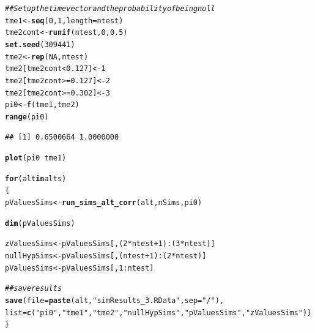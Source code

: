 \documentclass{article}\usepackage[]{graphicx}\usepackage[]{color}
\makeatletter
\newcommand{\hlnum}[1]{\textcolor[rgb]{0.686,0.059,0.569}{#1}}%
\newcommand{\hlstr}[1]{\textcolor[rgb]{0.192,0.494,0.8}{#1}}%
\newcommand{\hlcom}[1]{\textcolor[rgb]{0.678,0.584,0.686}{\textit{#1}}}%
\newcommand{\hlopt}[1]{\textcolor[rgb]{0,0,0}{#1}}%
\newcommand{\hlstd}[1]{\textcolor[rgb]{0.345,0.345,0.345}{#1}}%
\newcommand{\hlkwa}[1]{\textcolor[rgb]{0.161,0.373,0.58}{\textbf{#1}}}%
\newcommand{\hlkwb}[1]{\textcolor[rgb]{0.69,0.353,0.396}{#1}}%
\newcommand{\hlkwc}[1]{\textcolor[rgb]{0.333,0.667,0.333}{#1}}%
\newcommand{\hlkwd}[1]{\textcolor[rgb]{0.737,0.353,0.396}{\textbf{#1}}}%
\newenvironment{kframe}{%
 \def\at@end@of@kframe{}%
 \ifinner\ifhmode%
  \def\at@end@of@kframe{\end{minipage}}%
  \begin{minipage}{\columnwidth}%
 \fi\fi%
 \def\FrameCommand##1{\hskip\@totalleftmargin \hskip-\fboxsep
 \colorbox{shadecolor}{##1}\hskip-\fboxsep
     \hskip-\linewidth \hskip-\@totalleftmargin \hskip\columnwidth}%
 \MakeFramed {\advance\hsize-\width
   \@totalleftmargin\z@ \linewidth\hsize
   \@setminipage}}%
 {\par\unskip\endMakeFramed%
 \at@end@of@kframe}
\newenvironment{knitrout}{}{} %
\makeatother
\begin{document}
\begin{knitrout}
\color{fgcolor}\begin{kframe}
\begin{alltt}
\hlcom{## Set up the time vector and the probability of being null}
\hlstd{tme1} \hlkwb{<-} \hlkwd{seq}\hlstd{(}\hlnum{0}\hlstd{,}\hlnum{1}\hlstd{,}\hlkwc{length}\hlstd{=ntest)}
\hlstd{tme2cont} \hlkwb{<-} \hlkwd{runif}\hlstd{(ntest,}\hlnum{0}\hlstd{,}\hlnum{0.5}\hlstd{)}
\hlkwd{set.seed}\hlstd{(}\hlnum{309441}\hlstd{)}
\hlstd{tme2} \hlkwb{<-} \hlkwd{rep}\hlstd{(}\hlnum{NA}\hlstd{, ntest)}
\hlstd{tme2[tme2cont} \hlopt{<} \hlnum{0.127}\hlstd{]} \hlkwb{<-} \hlnum{1}
\hlstd{tme2[tme2cont} \hlopt{>=} \hlnum{0.127}\hlstd{]} \hlkwb{<-} \hlnum{2}
\hlstd{tme2[tme2cont} \hlopt{>=} \hlnum{0.302}\hlstd{]} \hlkwb{<-} \hlnum{3}
\hlstd{pi0} \hlkwb{<-} \hlkwd{f}\hlstd{(tme1, tme2)}
\hlkwd{range}\hlstd{(pi0)}
\end{alltt}
\begin{verbatim}
## [1] 0.6500664 1.0000000
\end{verbatim}
\begin{alltt}
\hlkwd{plot}\hlstd{(pi0} \hlopt{~} \hlstd{tme1)}

\hlkwa{for}\hlstd{(alt} \hlkwa{in} \hlstd{alts)}
\hlstd{\{}
  \hlstd{pValuesSims} \hlkwb{<-} \hlkwd{run_sims_alt_corr}\hlstd{(alt, nSims, pi0)}

  \hlkwd{dim}\hlstd{(pValuesSims)}

  \hlstd{zValuesSims} \hlkwb{<-} \hlstd{pValuesSims[,(}\hlnum{2}\hlopt{*}\hlstd{ntest}\hlopt{+}\hlnum{1}\hlstd{)}\hlopt{:}\hlstd{(}\hlnum{3}\hlopt{*}\hlstd{ntest)]}
  \hlstd{nullHypSims} \hlkwb{<-} \hlstd{pValuesSims[,(ntest}\hlopt{+}\hlnum{1}\hlstd{)}\hlopt{:}\hlstd{(}\hlnum{2}\hlopt{*}\hlstd{ntest)]}
  \hlstd{pValuesSims} \hlkwb{<-} \hlstd{pValuesSims[,}\hlnum{1}\hlopt{:}\hlstd{ntest]}

  \hlcom{##save results}
  \hlkwd{save}\hlstd{(}\hlkwc{file}\hlstd{=}\hlkwd{paste}\hlstd{(alt,} \hlstr{"simResults_3.RData"}\hlstd{,}\hlkwc{sep}\hlstd{=}\hlstr{"/"}\hlstd{),}
       \hlkwc{list}\hlstd{=}\hlkwd{c}\hlstd{(}\hlstr{"pi0"}\hlstd{,} \hlstr{"tme1"}\hlstd{,} \hlstr{"tme2"}\hlstd{,} \hlstr{"nullHypSims"}\hlstd{,}\hlstr{"pValuesSims"}\hlstd{,}\hlstr{"zValuesSims"}\hlstd{))}
\hlstd{\}}
\end{alltt}
\end{kframe}


\end{knitrout}
\end{document}
